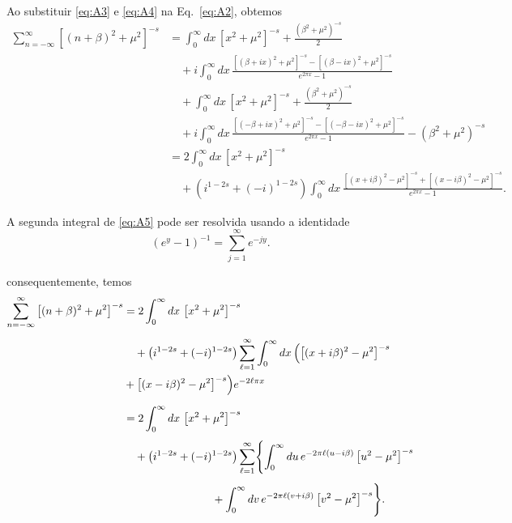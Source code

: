 Ao substituir \eqref{eq:A3} e \eqref{eq:A4} na Eq.~\eqref{eq:A2}, obtemos
\begin{equation}
\begin{aligned}
\sum_{n=-\infty}^{\infty} \left[(n+\beta)^2+\mu^2\right]^{-s}
&=
\int_{0}^{\infty} dx \,\left[x^2+\mu^2\right]^{-s}
+
\frac{(\beta^2+\mu^2)^{-s}}{2}
\\[4pt]
&\quad
+
i\int_{0}^{\infty} dx \,
\frac{
\left[(\beta+ix)^2+\mu^2\right]^{-s}
-
\left[(\beta-ix)^2+\mu^2\right]^{-s}
}{
e^{2\pi x}-1
}
\\[4pt]
&\quad
+
\int_{0}^{\infty} dx \,\left[x^2+\mu^2\right]^{-s}
+
\frac{(\beta^2+\mu^2)^{-s}}{2}
\\[4pt]
&\quad
+
i\int_{0}^{\infty} dx \,
\frac{
\left[(-\beta+ix)^2+\mu^2\right]^{-s}
-
\left[(-\beta-ix)^2+\mu^2\right]^{-s}
}{
e^{2\pi x}-1
}
-
(\beta^2+\mu^2)^{-s}
\\[4pt]
&=
2\int_{0}^{\infty} dx \,\left[x^2+\mu^2\right]^{-s}
\\[4pt]
&\quad
+
\left(i^{1-2s}+(-i)^{1-2s}\right)
\int_{0}^{\infty} dx \,
\frac{
\left[(x+i\beta)^2-\mu^2\right]^{-s}
+
\left[(x-i\beta)^2-\mu^2\right]^{-s}
}{
e^{2\pi x}-1
}.
\end{aligned}
\tag{A5}
\label{eq:A5}
\end{equation}

A segunda integral de \eqref{eq:A5} pode ser resolvida usando a identidade
\begin{equation}
\left(e^{y}-1\right)^{-1}
=
\sum_{j=1}^{\infty} e^{-jy}.
\tag{A6}
\label{eq:A6}
\end{equation}

consequentemente, temos
\begin{align*}
\sum_{n=-\infty}^{\infty} \left[(n+\beta)^2+\mu^2\right]^{-s}
&=
2\int_{0}^{\infty} dx \,\left[x^2+\mu^2\right]^{-s}
\\[4pt]
&\quad
+
\left(i^{1-2s}+(-i)^{1-2s}\right)
\sum_{\ell=1}^{\infty}
\int_{0}^{\infty} dx \,
\Bigl(
\left[(x+i\beta)^2-\mu^2\right]^{-s} \\
&+\left[(x-i\beta)^2-\mu^2\right]^{-s}
\Bigr)e^{-2\ell\pi x}
\\[6pt]
&=
2\int_{0}^{\infty} dx \,\left[x^2+\mu^2\right]^{-s}
\\[4pt]
&\quad
+
\left(i^{1-2s}+(-i)^{1-2s}\right)
\sum_{\ell=1}^{\infty}
\Biggl\{
\int_{0}^{\infty} du \, e^{-2\pi\ell(u-i\beta)} \left[u^2-\mu^2\right]^{-s}
\\[4pt]
&\qquad\qquad\qquad\qquad
+
\int_{0}^{\infty} dv \, e^{-2\pi\ell(v+i\beta)} \left[v^2-\mu^2\right]^{-s}
\Biggr\}.
\end{align*}

